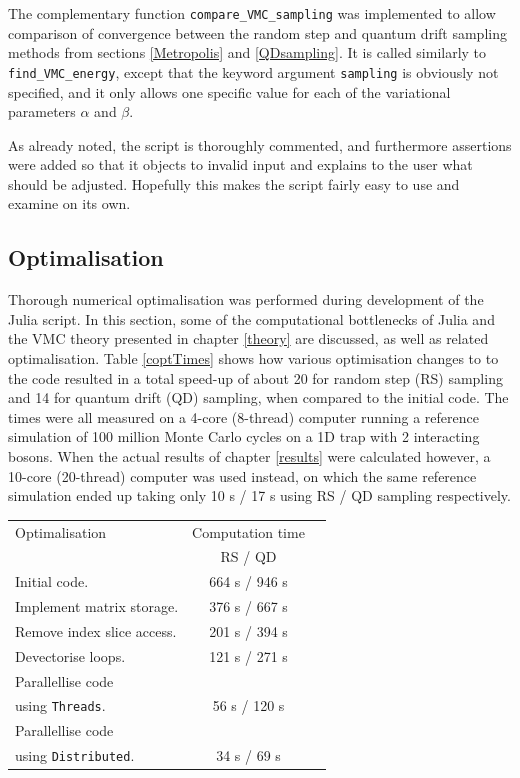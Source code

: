 \documentclass[a4paper,8pt]{article}
\begin{document}
\begin{multicols}{2}
The complementary function \texttt{compare\_VMC\_sampling} was implemented to allow comparison of convergence between the random step and quantum drift sampling methods from sections \ref{Metropolis} and \ref{QDsampling}. It is called similarly to \texttt{find\_VMC\_energy}, except that the keyword argument \texttt{sampling} is obviously not specified, and it only allows one specific value for each of the variational parameters $\alpha$ and $\beta$.

As already noted, the script is thoroughly commented, and furthermore assertions were added so that it objects to invalid input and explains to the user what should be adjusted. Hopefully this makes the script fairly easy to use and examine on its own.



\subsection{Optimalisation}\label{optimalisation}
Thorough numerical optimalisation was performed during development of the Julia script. In this section, some of the computational bottlenecks of Julia and the VMC theory presented in chapter \ref{theory} are discussed, as well as related optimalisation. Table \ref{coptTimes} shows how various optimisation changes to to the code resulted in a total speed-up of about 20 for random step (RS) sampling and 14 for quantum drift (QD) sampling, when compared to the initial code. The times were all measured on a 4-core (8-thread) computer running a reference simulation of 100 million Monte Carlo cycles on a 1D trap with 2 interacting bosons. When the actual results of chapter \ref{results} were calculated however, a 10-core (20-thread) computer was used instead, on which the same reference simulation ended up taking only {10 s / 17 s} using RS / QD sampling respectively.

\begin{center}\small
{}
\label{coptTimes}
\begin{tabular}{lcc}
	\hline\hline
	Optimalisation & Computation time \\
	 & RS / QD\\
	\hline
    Initial code. & 664 s / 946 s\\
    Implement matrix storage. & 376 s / 667 s\\
    Remove index slice access. & 201 s / 394 s\\
    Devectorise loops. & 121 s / 271 s\\
    Parallellise code & \\
    { using \texttt{Threads}.} & 56 s / 120 s\\
    Parallellise code & \\
    { using \texttt{Distributed}.} & 34 s / 69 s\\
    \hline\hline
\end{tabular}
\end{center}


\end{multicols}
\end{document}
